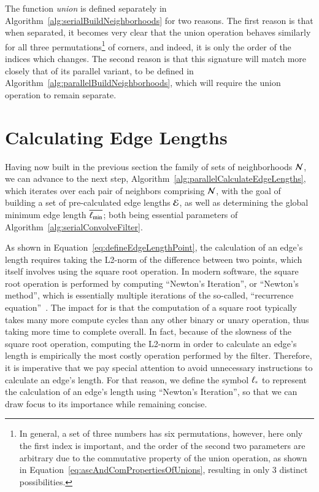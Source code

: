 The function \textit{union} is defined separately in Algorithm~\ref{alg:serialBuildNeighborhoods} for two reasons. The first reason is that when separated, it becomes very clear that the union operation behaves similarly for all three permutations\footnote{In general, a set of three numbers has six permutations, however, here only the first index is important, and the order of the second two parameters are arbitrary due to the commutative property of the union operation, as shown in Equation~\ref{eq:ascAndComPropertiesOfUnions}, resulting in only 3 distinct possibilities.} of corners, and indeed, it is only the order of the indices which changes. The second reason is that this signature will match more closely that of its parallel variant, to be defined in Algorithm~\ref{alg:parallelBuildNeighborhoods}, which will require the union operation to remain separate.

%
%
%
%
\section{Calculating Edge Lengths}
\label{ch4sCEL}
Having now built in the previous section the family of sets of neighborhoods $\mathcal{N}$, we can advance to the next step, Algorithm~\ref{alg:parallelCalculateEdgeLengths}, which iterates over each pair of neighbors comprising $\mathcal{N}$, with the goal of building a set of pre-calculated edge lengths $\mathcal{E}$, as well as determining the global minimum edge length $\overline{\ell_\text{min}}$; both being essential parameters of Algorithm~\ref{alg:serialConvolveFilter}.

As shown in Equation~\ref{eq:defineEdgeLengthPoint}, the calculation of an edge's length requires taking the L2-norm of the difference between two points, which itself involves using the square root operation. In modern software, the square root operation is performed by computing ``Newton's Iteration'', or ``Newton's method'', which is essentially multiple iterations of the so-called, ``recurrence equation''~\cite{Weisstein19b}. The impact for  is that the computation of a square root typically takes many more compute cycles than any other binary or unary operation, thus taking more time to complete overall. In fact, because of the slowness of the square root operation, computing the L2-norm in order to calculate an edge's length is empirically the most costly operation performed by the filter. Therefore, it is imperative that we pay special attention to avoid unnecessary instructions to calculate an edge's length. For that reason, we define the symbol $\ell_\ast$ to represent the calculation of an edge's length using ``Newton's Iteration'', so that we can draw focus to its importance while remaining concise.%
%


